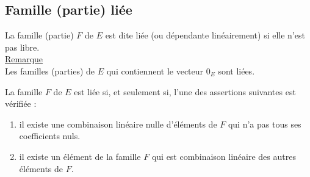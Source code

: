 \subsection{Famille (partie) liée}
\begin{defi}
    La famille (partie) \(F\) de \(E\) est dite liée (ou dépendante linéairement) si elle n’est pas libre.\\
    \underline{Remarque}\\
    Les familles (parties) de \(E\) qui contiennent le vecteur \(0_E\) sont liées.
\end{defi}

\begin{defprop}[Caractérisations]
    La famille \(F\) de \(E\) est liée si, et seulement si, l’une des assertions suivantes est vérifiée :
    \begin{enumerate}
        \item il existe une combinaison linéaire nulle d’éléments de \(F\) qui n’a pas tous ses coefficients nuls.
        \item il existe un élément de la famille \(F\) qui est combinaison linéaire des autres éléments de \(F\).
    \end{enumerate}
\end{defprop}
